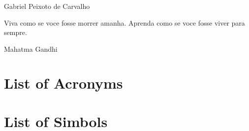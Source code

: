 \documentclass{ufpatcc}
\begin{document}
\ufpaPaginaDeRosto

\ufpaPagRostodo

\ufpaPaginaDeAprovacao


\begin{ufpaOferecimento}
%

\end{ufpaOferecimento}


\begin{ufpaAgradecimentos}

\begin{flushright}
Gabriel Peixoto de Carvalho
\end{flushright}

\end{ufpaAgradecimentos}


\begin{ufpaEpigrafe}
Viva como se voce fosse morrer amanha. Aprenda como se voce fosse viver para sempre.\\
\begin{flushright}Mahatma Gandhi\end{flushright}
\end{ufpaEpigrafe}


\chapter*{List of Acronyms} \label{sec:siglas}


\chapter*{List of Simbols} \label{sec:simbolos}



\listoffigures \clearpage \listoftables \clearpage

\end{document}
